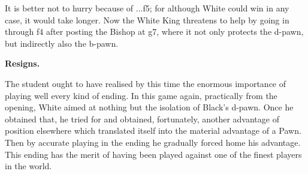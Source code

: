 \documentclass[10pt,twoside]{article}
\begin{document}

It is better not to hurry  because of ...f5; for although White could win in any case, it would take longer. Now the White King threatens to help by going in through f4 after posting the Bishop at g7, where it not only protects the d-pawn, but indirectly also the b-pawn.


\noindent\textbf{Resigns.}

The student ought to have realised by this time the enormous importance of playing well every kind of ending. In this game again, practically from the opening, White aimed at nothing but the isolation of Black's d-pawn. Once he obtained that, he tried for and obtained, fortunately, another advantage of position elsewhere which translated itself into the material advantage of a Pawn. Then by accurate playing in the ending he gradually forced home his advantage. This ending has the merit of having been played against one of the finest players in the world.
\end{document}
